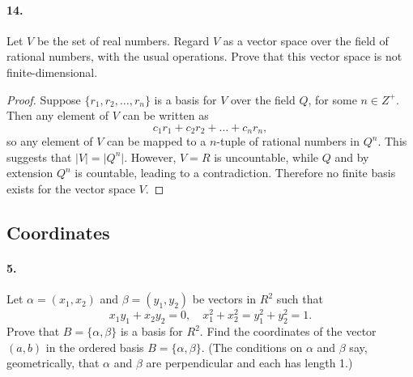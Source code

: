 \documentclass{article}
\begin{document}
\paragraph{14.} Let $V$ be the set of real numbers. Regard $V$ as a vector space
over the field of rational numbers, with the usual operations. Prove that this
vector space is not finite-dimensional.

\begin{proof}
  Suppose $\{r_1, r_2, \ldots, r_n\}$ is a basis for $V$ over the field
  $Q$, for some $n \in Z^+$. Then any element of $V$ can be written as \[
    c_1r_1 + c_2r_2 + \ldots + c_nr_n,
  \] so any element of $V$ can be mapped to a $n$-tuple of rational numbers in
  $Q^n$. This suggests that $\vert V \vert = \vert Q^n \vert$. However, $V = R$
  is uncountable, while $Q$ and by extension $Q^n$ is countable, leading to a
  contradiction. Therefore no finite basis exists for the vector space $V$.
\end{proof}

\subsection{Coordinates}

\paragraph{5.} Let $\alpha = (x_1, x_2)$ and $\beta = (y_1, y_2)$ be vectors in
$R^2$ such that \[
  x_1y_1 + x_2y_2 = 0,\quad
  x_1^2 + x_2^2 = y_1^2 + y_2^2 = 1.
\] Prove that $B = \{\alpha, \beta\}$ is a basis for $R^2$. Find the coordinates
of the vector $(a, b)$ in the ordered basis $B = \{\alpha, \beta\}$. (The
conditions on $\alpha$ and $\beta$ say, geometrically, that $\alpha$ and $\beta$
are perpendicular and each has length 1.)
\end{document}
